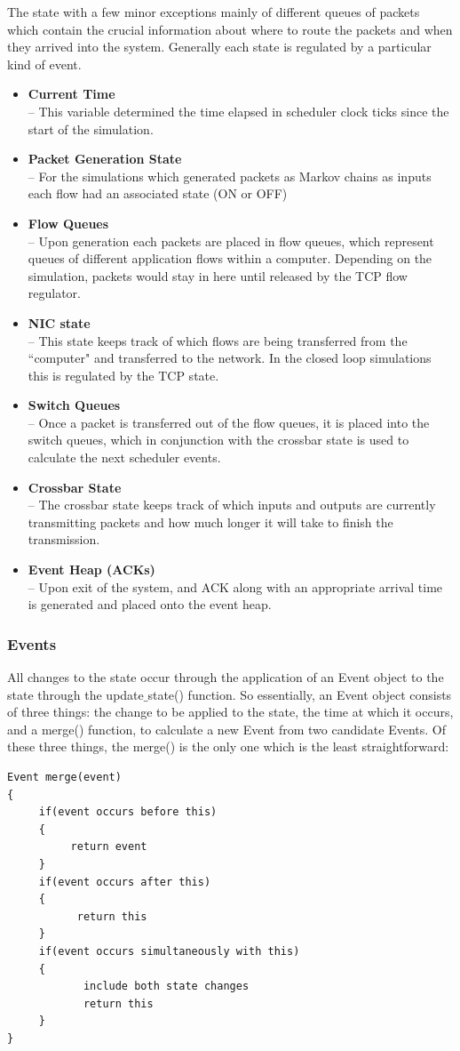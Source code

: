 \documentclass{IEEEtran}%
\begin{document}
The state with a few minor exceptions mainly of different queues of packets which contain the crucial information about where to route the packets and when they arrived into the system.  Generally each state is regulated by a particular kind of event.
\begin{itemize}
\item {\bf Current Time}\\
 --  This variable determined the time elapsed in scheduler clock ticks since the start of the simulation.
\item {\bf Packet Generation State}\\
 --  For the simulations which generated packets as Markov chains as inputs each flow had an associated state (ON or OFF)
\item {\bf Flow Queues}\\
 --  Upon generation each packets are placed in flow queues, which represent queues of different application flows within a computer.  Depending on the simulation, packets would stay in here until released by the TCP flow regulator.
\item {\bf NIC state}\\
 --  This state keeps track of which flows are being transferred from the ``computer" and transferred to the network.  In the closed loop simulations this is regulated by the TCP state.
\item {\bf Switch Queues}\\
--  Once a packet is transferred out of the flow queues, it is placed into the switch queues, which in conjunction with the crossbar state is used to calculate the next scheduler events.
\item {\bf Crossbar State}\\
--  The crossbar state keeps track of which inputs and outputs are currently transmitting packets and how much longer it will take to finish the transmission.
\item {\bf Event Heap (ACKs)}\\
--  Upon exit of the system, and ACK along with an appropriate arrival time is generated and placed onto the event heap.  
\end{itemize}

\subsubsection{Events}

All changes to the state occur through the application of an Event object to the state through the update$\_$state() function.  So essentially, an Event object consists of three things: the change to be applied to the state, the time at which it occurs, and a merge() function, to calculate a new Event from two candidate Events.  Of these three things, the merge() is the only one which is the least straightforward:
\begin{verbatim}
Event merge(event)
{
     if(event occurs before this)
     {
          return event
     }
     if(event occurs after this)
     {
           return this
     }
     if(event occurs simultaneously with this)
     {
            include both state changes
            return this
     }
}
\end{verbatim}
\end{document}

